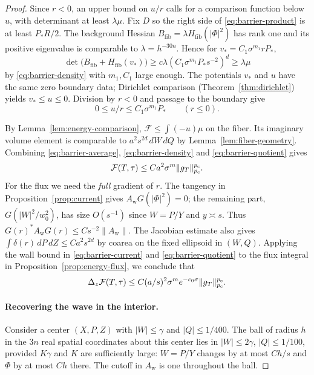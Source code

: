 \begin{proof}
Since $r<0$, an upper bound on $u/r$ calls for a comparison function
below $u$, with determinant at least $\lambda\mu$. Fix $D$ so the
right side of \eqref{eq:barrier-product} is at least
$P_*R/2$. The background Hessian $B_{\mathrm{fib}}=\lambda
H_{\mathrm{fib}}(|\Phi|^2)$ has rank one and its positive eigenvalue
is comparable to $\lambda=h^{-30n}$. Hence for
$v_*=C_1\sigma^{m_1}rP_*$,
\[
 \det\big(B_{\mathrm{fib}}+H_{\mathrm{fib}}(v_*)\big)
 \ge c\lambda (C_1\sigma^{m_1}P_*s^{-2})^d\ge\lambda\mu
\]
by \eqref{eq:barrier-density} with $m_1,C_1$ large enough. The
potentials $v_*$ and $u$ have the same zero boundary data; Dirichlet
comparison (Theorem~\ref{thm:dirichlet}) yields $v_*\le u\le0$.
Division by $r<0$ and passage to the boundary give
\begin{equation}\label{eq:barrier-quotient}
 0\le u/r\le C_1\sigma^{m_1}P_*\qquad(r\le0).
\end{equation}

By Lemma~\ref{lem:energy-comparison}, $\mathcal F\le\int(-u)\mu$ on the
fiber. Its imaginary volume element is comparable to
$a^2s^{2d}\,dW\,dQ$ by Lemma~\ref{lem:fiber-geometry}. Combining
\eqref{eq:barrier-average}, \eqref{eq:barrier-density} and
\eqref{eq:barrier-quotient} gives
\begin{equation}\label{eq:barrier-upper-all}
 \mathcal F(T,\tau)\le Ca^2\sigma^m\|g_T\|_{p_{\mathrm c}}^{p_{\mathrm c}}.
\end{equation}
For the flux we need the \emph{full} gradient of $r$. The tangency in
Proposition~\ref{prop:current} gives $A_{\mathrm w}G(|\Phi|^2)=0$;
the remaining part, $G(|W|^2/w_0^2)$, has size $O(s^{-1})$ since
$W=P/Y$ and $y\asymp s$. Thus $G(r)^*A_{\mathrm w}G(r)\le
C s^{-2}\|A_{\mathrm w}\|$. The Jacobian estimate also gives
$\int\delta(r)\,dP\,dZ\le C a^2s^{2d}$ by coarea on the fixed
ellipsoid in $(W,Q)$. Applying the wall bound in
\eqref{eq:barrier-current} and \eqref{eq:barrier-quotient} to the
flux integral in Proposition~\ref{prop:energy-flux}, we conclude that
\begin{equation}\label{eq:barrier-flux-all}
 \Delta_z\mathcal F(T,\tau)
  \le C (a/s)^2\sigma^m e^{-c_0\sigma}\|g_T\|_{p_{\mathrm c}}^{p_{\mathrm c}}.
\end{equation}

\paragraph{Recovering the wave in the interior.}
Consider a center $(X,P,Z)$ with $|W|\le\gamma$ and $|Q|\le1/400$.
The ball of radius $h$ in the $3n$ real spatial coordinates about this
center lies in $|W|\le2\gamma$, $|Q|\le1/100$, provided $K\gamma$
and $K$ are sufficiently large: $W=P/Y$ changes by at most $Ch/s$
and $\Phi$ by at most $Ch$ there. The cutoff in $A_{\mathrm w}$ is
one throughout the ball.


\end{proof}
